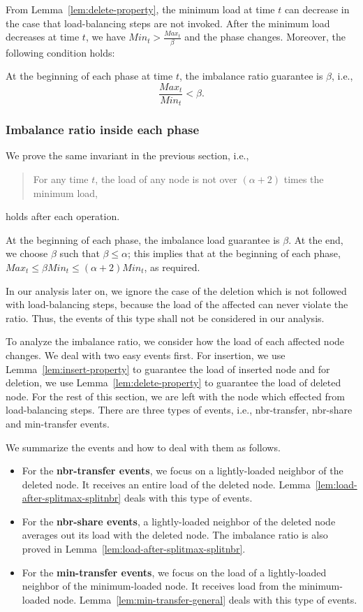 \documentclass[a4paper]{article}
\begin{document}
From Lemma~\ref{lem:delete-property}, the minimum load at time $t$ can
decrease in the case that  load-balancing steps are not invoked.
After the minimum load decreases at time $t$, we have
$Min_t>\frac{Max_t}{\beta}$ and the phase changes.  Moreover, the following
condition holds:

At the beginning of each phase at time $t$, the imbalance ratio
guarantee is $\beta$, i.e.,
\[
\frac{Max_t}{Min_t} < \beta.
\]

\subsubsection{Imbalance ratio inside each phase}
\label{sect:inside-phase}

We prove the same invariant in the previous section, i.e.,
\begin{quote} {\sc For any time $t$, the load of any node is not over
    $(\alpha+2)$ times  the minimum load,}
\end{quote}
holds after each operation.

At the beginning of each phase, the imbalance load
guarantee is $\beta$.  At the end, we choose $\beta$ 
such that $\beta\leq\alpha$; this implies that at the beginning of 
each phase, $Max_t\leq\beta Min_t\leq (\alpha+2) Min_t$, as required.

In our analysis later on, we ignore the case of the deletion 
which is not followed with load-balancing steps, because 
the load of the affected can never violate the ratio.  Thus,
the events of this type shall not be considered in our analysis.

To analyze the imbalance ratio, we consider how the load of
each affected node changes. We deal with two easy events first.  
For insertion, we use Lemma~\ref{lem:insert-property} to guarantee 
the load of inserted node and  for deletion, we use 
Lemma~\ref{lem:delete-property} to guarantee the load of deleted node.
For the rest of this section, we are left with the node which effected
from  load-balancing steps.  There are three types of events, i.e.,
 nbr-transfer, nbr-share and min-transfer events.

We summarize the events and how to deal with them as follows.

\begin{itemize}
\item For the {\bf nbr-transfer events}, we focus on a
  lightly-loaded neighbor of the deleted node. It receives an entire load
  of the deleted node.  Lemma~\ref{lem:load-after-splitmax-splitnbr} deals
  with this type of events.
\item For the {\bf nbr-share events}, a lightly-loaded neighbor of the
  deleted node averages out its load with the deleted node. The imbalance
  ratio is also proved in
  Lemma~\ref{lem:load-after-splitmax-splitnbr}.
\item For the {\bf min-transfer events}, we focus on the load of a
  lightly-loaded neighbor of the minimum-loaded node. It receives load
  from the minimum-loaded node.  Lemma~\ref{lem:min-transfer-general}
  deals with this type of events.
\end{itemize}
\end{document}
